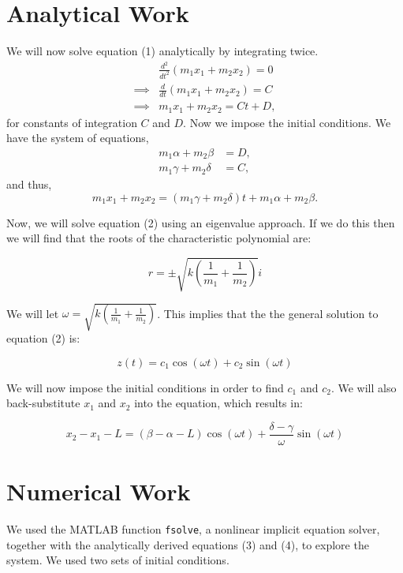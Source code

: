 \documentclass[11pt, oneside]{article}   	%
\begin{document}
\section{Analytical Work}
We will now solve equation (1) analytically by integrating twice.
\begin{align*}
&\frac{d^2}{dt^2}(m_1x_1 + m_2x_2) = 0 \\
\implies & \frac{d}{dt}(m_1x_1 + m_2x_2) = C\\
\implies & m_1x_1 + m_2x_2 = Ct+D,
\end{align*}
for constants of integration $C$ and $D$. Now we impose the initial conditions. We have the system of equations,
\begin{align*}
m_1\alpha + m_2\beta &= D, \\
m_1\gamma + m_2\delta &= C,
\end{align*}
and thus,
\begin{equation}
m_1x_1 + m_2x_2 = (m_1\gamma + m_2\delta)t + m_1\alpha + m_2\beta.
\end{equation}

Now, we will solve equation (2) using an eigenvalue approach. If we do this then we will find that the roots of the characteristic polynomial are:

$$r = \pm \sqrt{k\left(\frac{1}{m_1}+\frac{1}{m_2}\right)}i$$

We will let $\displaystyle{\omega = \sqrt{k\left(\frac{1}{m_1}+\frac{1}{m_2}\right)}}$. This implies that the the general solution to equation (2) is:

$$z(t) = c_1\cos{(\omega t)}+c_2\sin{(\omega t)}$$

We will now impose the initial conditions in order to find $c_1$ and $c_2$. We will also back-substitute $x_1$ and $x_2$ into the equation, which results in:

\begin{equation}
x_2-x_1-L = \left(\beta - \alpha - L\right)\cos{\left(\omega t\right)}+\frac{\delta - \gamma}{\omega}\sin{(\omega t)}
\end{equation}

\section{Numerical Work}
We used the MATLAB function \texttt{fsolve}, a nonlinear implicit equation solver, together with the analytically derived equations (3) and (4), to explore the system. We used two sets of initial conditions.
\end{document}
